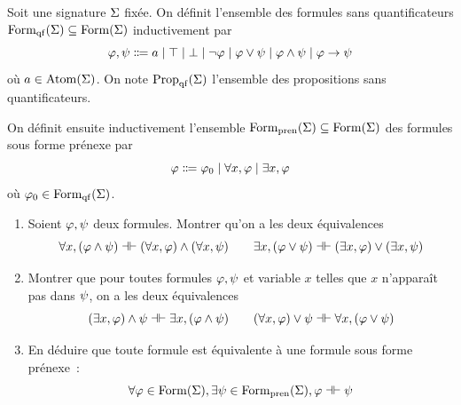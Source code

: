 \begin{exercise}\label{exo.prenexe}
  Soit une signature $\Sigma$ fixée. On définit l'ensemble des formules sans
  quantificateurs $\operatorname{Form}_{\mathrm{qf}}(\Sigma)\subseteq \operatorname{Form}(\Sigma)$ inductivement par
  \[\varFF, \varFP \inddefeq a\mid \top \mid \bot \mid
  \lnot \varFF \mid \varFF \lor \varFP \mid \varFF \land \varFP \mid
  \varFF \to \varFP\]
  où $a \in \operatorname{Atom}(\Sigma)$. On note $\operatorname{Prop}_{\mathrm{qf}}(\Sigma)$ l'ensemble des propositions
  sans quantificateurs.

  On définit ensuite inductivement l'ensemble
  $\operatorname{Form}_{\mathrm{pren}}(\Sigma)\subseteq \operatorname{Form}(\Sigma)$
  des formules sous forme prénexe par
  \[\varFF\inddefeq \varFF_0\mid \forall x, \varFF \mid \exists x, \varFF\]
  où $\varphi_0 \in \operatorname{Form}_{\mathrm{qf}}(\Sigma)$.

  \begin{enumerate}[label=(\roman*)]
  \item Soient $\varphi, \psi$ deux formules. Montrer qu'on a les deux
    équivalences
    \[\forall x, (\varphi \land \psi) \mathrel{\mathord{\dashv}\mathord{\vdash}}
    (\forall x, \varphi) \land (\forall x, \psi) \qquad
    \exists x, (\varphi \lor \psi) \mathrel{\mathord{\dashv}\mathord{\vdash}}
    (\exists x, \varphi) \lor (\exists x, \psi)\]
  \item Montrer que pour toutes formules $\varphi, \psi$ et variable $x$
    telles que $x$ n'apparaît pas dans $\psi$, on a les deux équivalences
    \[(\exists x,\varphi) \land \psi\mathrel{\mathord{\dashv}\mathord{\vdash}}
    \exists x, (\varphi \land \psi) \qquad
    (\forall x, \varphi) \lor \psi \mathrel{\mathord{\dashv}\mathord{\vdash}}
    \forall x, (\varphi \lor \psi)\]
  \item En déduire que toute formule est équivalente à une formule sous forme
    prénexe~:
    \[\forall \varphi \in \operatorname{Form}(\Sigma), \exists \psi \in \operatorname{Form}_{\mathrm{pren}}(\Sigma),
    \varphi \mathrel{\mathord{\dashv}\mathord{\vdash}} \psi\]
  \end{enumerate}
\end{exercise}

